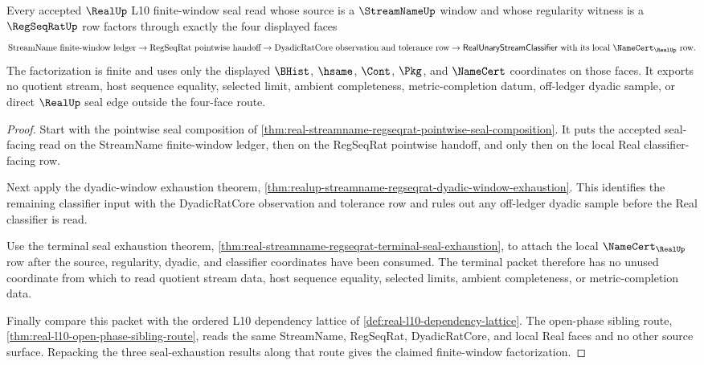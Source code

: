 \begin{theorem}
\label{thm:streamname-regseqrat-realup-finite-window-factorization}
Every accepted $\RealUp$ L10 finite-window seal read whose source is a
$\StreamNameUp$ window and whose regularity witness is a $\RegSeqRatUp$ row
factors through exactly the four displayed faces
$$
\text{StreamName finite-window ledger}
\to
\text{RegSeqRat pointwise handoff}
\to
\text{DyadicRatCore observation and tolerance row}
\to
\mathsf{RealUnaryStreamClassifier}\text{ with its local }\NameCert_{\RealUp}\text{ row}.
$$
The factorization is finite and uses only the displayed $\BHist$, $\hsame$,
$\Cont$, $\Pkg$, and $\NameCert$ coordinates on those faces. It exports no
quotient stream, host sequence equality, selected limit, ambient completeness,
metric-completion datum, off-ledger dyadic sample, or direct $\RealUp$ seal
edge outside the four-face route.
\end{theorem}
\begin{proof}
Start with the pointwise seal composition of
\autoref{thm:real-streamname-regseqrat-pointwise-seal-composition}. It puts
the accepted seal-facing read on the StreamName finite-window ledger, then on
the RegSeqRat pointwise handoff, and only then on the local Real
classifier-facing row.

Next apply the dyadic-window exhaustion theorem,
\autoref{thm:realup-streamname-regseqrat-dyadic-window-exhaustion}. This
identifies the remaining classifier input with the DyadicRatCore observation
and tolerance row and rules out any off-ledger dyadic sample before the Real
classifier is read.

Use the terminal seal exhaustion theorem,
\autoref{thm:real-streamname-regseqrat-terminal-seal-exhaustion}, to attach
the local $\NameCert_{\RealUp}$ row after the source, regularity, dyadic, and
classifier coordinates have been consumed. The terminal packet therefore has
no unused coordinate from which to read quotient stream data, host sequence
equality, selected limits, ambient completeness, or metric-completion data.

Finally compare this packet with the ordered L10 dependency lattice of
\autoref{def:real-l10-dependency-lattice}. The open-phase sibling route,
\autoref{thm:real-l10-open-phase-sibling-route}, reads the same
StreamName, RegSeqRat, DyadicRatCore, and local Real faces and no other
source surface. Repacking the three seal-exhaustion results along that route
gives the claimed finite-window factorization.
\end{proof}

